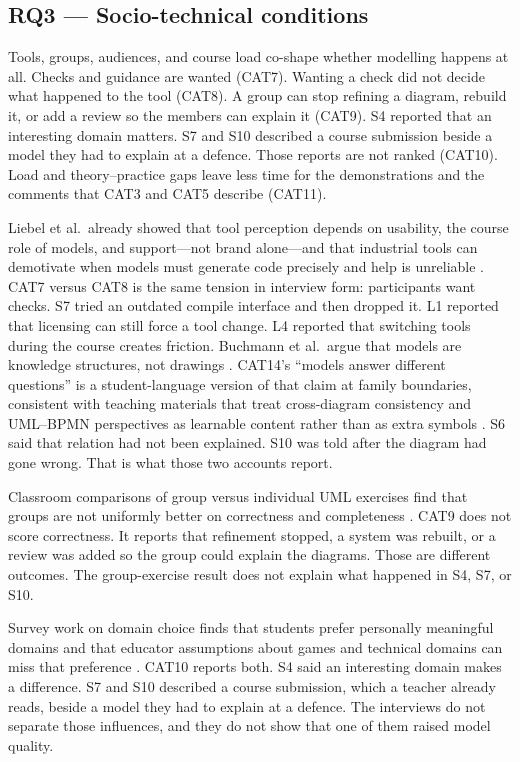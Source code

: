 \subsection{RQ3 --- Socio-technical conditions}

Tools, groups, audiences, and course load co-shape whether modelling happens at all. Checks and guidance are wanted (CAT7). Wanting a check did not decide what happened to the tool (CAT8). A group can stop refining a diagram, rebuild it, or add a review so the members can explain it (CAT9). S4 reported that an interesting domain matters. S7 and S10 described a course submission beside a model they had to explain at a defence. Those reports are not ranked (CAT10). Load and theory--practice gaps leave less time for the demonstrations and the comments that CAT3 and CAT5 describe (CAT11).

Liebel et al.\ already showed that tool perception depends on usability, the course role of models, and support---not brand alone---and that industrial tools can demotivate when models must generate code precisely and help is unreliable \cite{liebel2017model}. CAT7 versus CAT8 is the same tension in interview form: participants want checks. S7 tried an outdated compile interface and then dropped it. L1 reported that licensing can still force a tool change. L4 reported that switching tools during the course creates friction. Buchmann et al.\ argue that models are knowledge structures, not drawings \cite{buchmann2019conceptual}. CAT14's ``models answer different questions'' is a student-language version of that claim at family boundaries, consistent with teaching materials that treat cross-diagram consistency and UML--BPMN perspectives as learnable content rather than as extra symbols \cite{sikkel2010consistency,verbruggen2022multiperspective}. S6 said that relation had not been explained. S10 was told after the diagram had gone wrong. That is what those two accounts report.

Classroom comparisons of group versus individual UML exercises find that groups are not uniformly better on correctness and completeness \cite{silva2018group}. CAT9 does not score correctness. It reports that refinement stopped, a system was rebuilt, or a review was added so the group could explain the diagrams. Those are different outcomes. The group-exercise result does not explain what happened in S4, S7, or S10.

Survey work on domain choice finds that students prefer personally meaningful domains and that educator assumptions about games and technical domains can miss that preference \cite{grassl2026dei}. CAT10 reports both. S4 said an interesting domain makes a difference. S7 and S10 described a course submission, which a teacher already reads, beside a model they had to explain at a defence. The interviews do not separate those influences, and they do not show that one of them raised model quality.


